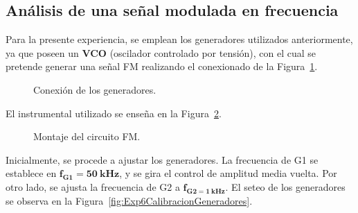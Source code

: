   \subsection{Análisis de una señal modulada en frecuencia}
    Para la presente experiencia, se emplean los generadores utilizados anteriormente, 
    ya que poseen un \textbf{VCO} (oscilador controlado por tensión), con el 
    cual se pretende generar una señal FM realizando el conexionado de la 
    Figura~\ref{fig:Exp6EsquemaGeneradores}. 

      \begin{figure}[H]
        \centering
          \caption{Conexión de los generadores.}
          \label{fig:Exp6EsquemaGeneradores}
      \end{figure}

    El instrumental utilizado se enseña en la Figura~\ref{fig:Exp6Montaje}.

      \begin{figure}[H]
        \centering
          \caption{Montaje del circuito FM.}
          \label{fig:Exp6Montaje}
      \end{figure}    
     
    
    Inicialmente, se procede a ajustar los generadores. La frecuencia de G1 se establece en 
    $\mathbf{f_{G1}=50~kHz}$, y se gira el control de amplitud media vuelta. Por otro lado, se ajusta la 
    frecuencia de G2 a $\mathbf{f_{G2=1~kHz}}$. El seteo de los generadores se observa en la 
    Figura~\ref{fig:Exp6CalibracionGeneradores}.

